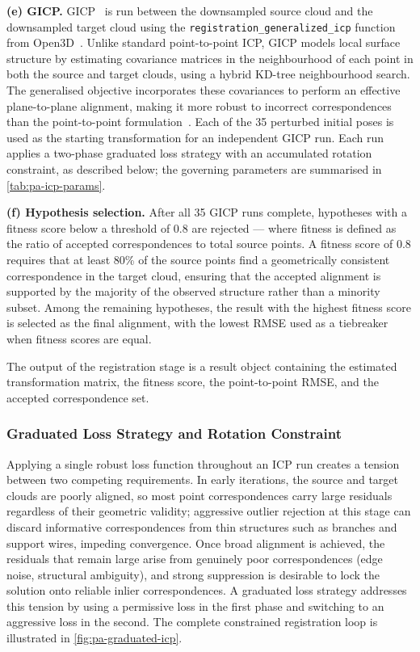 \textbf{(e) GICP.} GICP~\cite{segalGeneralizedICP2009} is run between the downsampled source cloud and the downsampled target cloud using the \texttt{registration\_generalized\_icp} function from Open3D~\cite{zhouOpen3DModernLibrary2018}. Unlike standard point-to-point ICP, GICP models local surface structure by estimating covariance matrices in the neighbourhood of each point in both the source and target clouds, using a hybrid KD-tree neighbourhood search. The generalised objective incorporates these covariances to perform an effective plane-to-plane alignment, making it more robust to incorrect correspondences than the point-to-point formulation~\cite{segalGeneralizedICP2009}. Each of the 35 perturbed initial poses is used as the starting transformation for an independent GICP run. Each run applies a two-phase graduated loss strategy with an accumulated rotation constraint, as described below; the governing parameters are summarised in \cref{tab:pa-icp-params}.

\textbf{(f) Hypothesis selection.} After all 35 GICP runs complete, hypotheses with a fitness score below a threshold of 0.8 are rejected --- where fitness is defined as the ratio of accepted correspondences to total source points. A fitness score of 0.8 requires that at least 80\% of the source points find a geometrically consistent correspondence in the target cloud, ensuring that the accepted alignment is supported by the majority of the observed structure rather than a minority subset. Among the remaining hypotheses, the result with the highest fitness score is selected as the final alignment, with the lowest RMSE used as a tiebreaker when fitness scores are equal.

The output of the registration stage is a result object containing the estimated transformation matrix, the fitness score, the point-to-point RMSE, and the accepted correspondence set.

\subsubsection*{Graduated Loss Strategy and Rotation Constraint}
\label{subsubsec:pa-graduated-icp}

Applying a single robust loss function throughout an ICP run creates a tension between two competing requirements. In early iterations, the source and target clouds are poorly aligned, so most point correspondences carry large residuals regardless of their geometric validity; aggressive outlier rejection at this stage can discard informative correspondences from thin structures such as branches and support wires, impeding convergence. Once broad alignment is achieved, the residuals that remain large arise from genuinely poor correspondences (edge noise, structural ambiguity), and strong suppression is desirable to lock the solution onto reliable inlier correspondences. A graduated loss strategy addresses this tension by using a permissive loss in the first phase and switching to an aggressive loss in the second. The complete constrained registration loop is illustrated in \cref{fig:pa-graduated-icp}.

